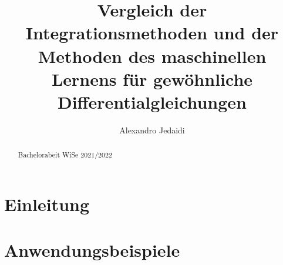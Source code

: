 \documentclass[
    paper=a4, %
    fontsize=12pt,  %
    oneside,        %
    headsepline,    %
    notitlepage     %
]{extarticle}         %
\author{Alexandro Jedaidi}
\title{\textbf{Vergleich der Integrationsmethoden und der Methoden des maschinellen Lernens für gewöhnliche Differentialgleichungen}}
\date{}
\numberwithin{equation}{section}
\begin{document}
    \maketitle
    \tableofcontents
    \newpage
    \begin{abstract}
        Bachelorabeit WiSe 2021/2022
    \end{abstract}
    \pagestyle{headings}

    \section{Einleitung}

    

    

    

    \section{Anwendungsbeispiele}
    \label{sec:anwendungsbeispiele}

    \newpage
    \printbibliography[heading=bibintoc]
    \newpage
    \listoffigures
\end{document}
